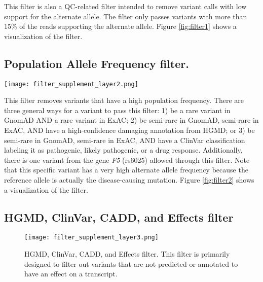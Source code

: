 \documentclass{article}
\begin{document}
This filter is also a QC-related filter intended to remove variant calls with low support for the alternate allele.  The filter only passes variants with more than 15\% of the reads supporting the alternate allele.  Figure \ref{fig:filter1} shows a visualization of the filter.

\subsection{Population Allele Frequency filter.}

\begin{sidewaysfigure}
\centering
\texttt{[image: filter\_supplement\_layer2.png]}
\caption{Population Allele Frequency filter.  This filter is primarily designed to filter out variants with a high population frequency.  It relies mostly on GnomAD and ExAC to determine allele frequencies.  Variants that are only semi-rare are allowed through if there are appropriate HGMD or ClinVar annotations supporting them.  Additionally, one variant in gene {\it F5} (rs6025) is allowed through because the reference allele is actually the rare, pathogenic allele.}
\label{fig:filter2}
\end{sidewaysfigure}

This filter removes variants that have a high population frequency.  There are three general ways for a variant to pass this filter: 1) be a rare variant in GnomAD AND a rare variant in ExAC; 2) be semi-rare in GnomAD, semi-rare in ExAC, AND have a high-confidence damaging annotation from HGMD; or 3) be semi-rare in GnomAD, semi-rare in ExAC, AND have a ClinVar classification labeling it as pathogenic, likely pathogenic, or a drug response.  Additionally, there is one variant from the gene {\it F5} (rs6025) allowed through this filter.  Note that this specific variant has a very high alternate allele frequency because the reference allele is actually the disease-causing mutation.  Figure \ref{fig:filter2} shows a visualization of the filter.

\subsection{HGMD, ClinVar, CADD, and Effects filter}

\begin{figure}
\centering
\texttt{[image: filter\_supplement\_layer3.png]}
\caption{HGMD, ClinVar, CADD, and Effects filter.  This filter is primarily designed to filter out variants that are not predicted or annotated to have an effect on a transcript.}
\label{fig:filter3}
\end{figure}
\end{document}
